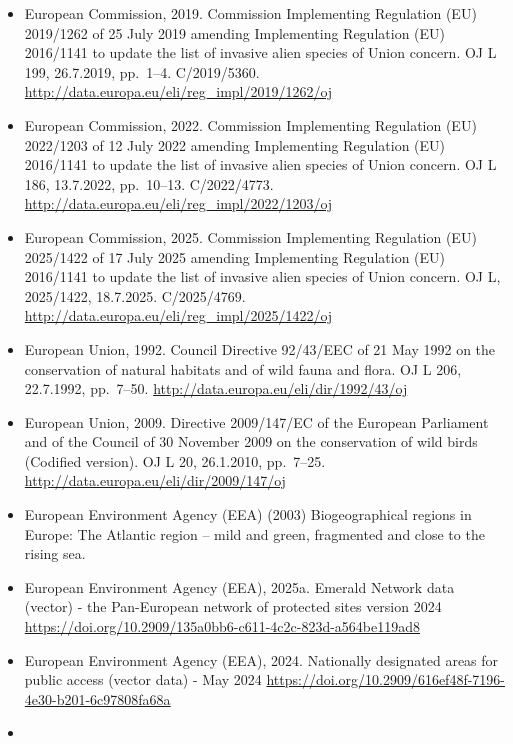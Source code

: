 \documentclass[
]{article}
\begin{document}
\begin{itemize}
  of Union concern established by Implementing Regulation (EU) 2016/1141
  pursuant to Regulation (EU) No 1143/2014 of the European Parliament
  and of the Council. OJ L 182, 13.7.2017, pp.~37--39. C/2017/4755.
  \url{http://data.europa.eu/eli/reg_impl/2017/1263/oj}
\item
  European Commission, 2019. Commission Implementing Regulation (EU)
  2019/1262 of 25 July 2019 amending Implementing Regulation (EU)
  2016/1141 to update the list of invasive alien species of Union
  concern. OJ L 199, 26.7.2019, pp.~1--4. C/2019/5360.
  \url{http://data.europa.eu/eli/reg_impl/2019/1262/oj}
\item
  European Commission, 2022. Commission Implementing Regulation (EU)
  2022/1203 of 12 July 2022 amending Implementing Regulation (EU)
  2016/1141 to update the list of invasive alien species of Union
  concern. OJ L 186, 13.7.2022, pp.~10--13. C/2022/4773.
  \url{http://data.europa.eu/eli/reg_impl/2022/1203/oj}
\item
  European Commission, 2025. Commission Implementing Regulation (EU)
  2025/1422 of 17 July 2025 amending Implementing Regulation (EU)
  2016/1141 to update the list of invasive alien species of Union
  concern. OJ L, 2025/1422, 18.7.2025. C/2025/4769.
  \url{http://data.europa.eu/eli/reg_impl/2025/1422/oj}
\item
  European Union, 1992. Council Directive 92/43/EEC of 21 May 1992 on
  the conservation of natural habitats and of wild fauna and flora. OJ L
  206, 22.7.1992, pp.~7--50.
  \url{http://data.europa.eu/eli/dir/1992/43/oj}
\item
  European Union, 2009. Directive 2009/147/EC of the European Parliament
  and of the Council of 30 November 2009 on the conservation of wild
  birds (Codified version). OJ L 20, 26.1.2010, pp.~7--25.
  \url{http://data.europa.eu/eli/dir/2009/147/oj}
\item
  European Environment Agency (EEA) (2003) Biogeographical regions in
  Europe: The Atlantic region -- mild and green, fragmented and close to
  the rising sea.
\item
  European Environment Agency (EEA), 2025a. Emerald Network data
  (vector) - the Pan-European network of protected sites version 2024
  \url{https://doi.org/10.2909/135a0bb6-c611-4c2c-823d-a564be119ad8}
\item
  European Environment Agency (EEA), 2024. Nationally designated areas
  for public access (vector data) - May 2024
  \url{https://doi.org/10.2909/616ef48f-7196-4e30-b201-6c97808fa68a}
\item

\end{itemize}
\end{document}
